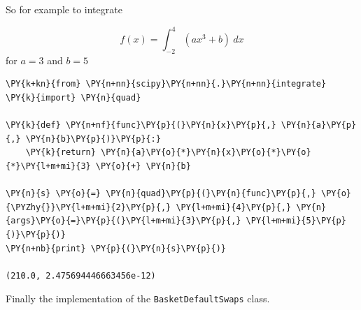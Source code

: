 So for example to integrate

\[f(x) = \int_{-2}^{4}(ax^{3} + b)~dx\]
for \(a=3\) and \(b=5\)

\begin{tcolorbox}[breakable, size=fbox, boxrule=1pt, pad at break*=1mm,colback=cellbackground, colframe=cellborder]
\begin{Verbatim}[commandchars=\\\{\}]
\PY{k+kn}{from} \PY{n+nn}{scipy}\PY{n+nn}{.}\PY{n+nn}{integrate} \PY{k}{import} \PY{n}{quad}
	
\PY{k}{def} \PY{n+nf}{func}\PY{p}{(}\PY{n}{x}\PY{p}{,} \PY{n}{a}\PY{p}{,} \PY{n}{b}\PY{p}{)}\PY{p}{:}
    \PY{k}{return} \PY{n}{a}\PY{o}{*}\PY{n}{x}\PY{o}{*}\PY{o}{*}\PY{l+m+mi}{3} \PY{o}{+} \PY{n}{b}
	
\PY{n}{s} \PY{o}{=} \PY{n}{quad}\PY{p}{(}\PY{n}{func}\PY{p}{,} \PY{o}{\PYZhy{}}\PY{l+m+mi}{2}\PY{p}{,} \PY{l+m+mi}{4}\PY{p}{,} \PY{n}{args}\PY{o}{=}\PY{p}{(}\PY{l+m+mi}{3}\PY{p}{,} \PY{l+m+mi}{5}\PY{p}{)}\PY{p}{)}
\PY{n+nb}{print} \PY{p}{(}\PY{n}{s}\PY{p}{)}

(210.0, 2.475694446663456e-12)
\end{Verbatim}
\end{tcolorbox}

Finally the implementation of the \texttt{BasketDefaultSwaps} class.

